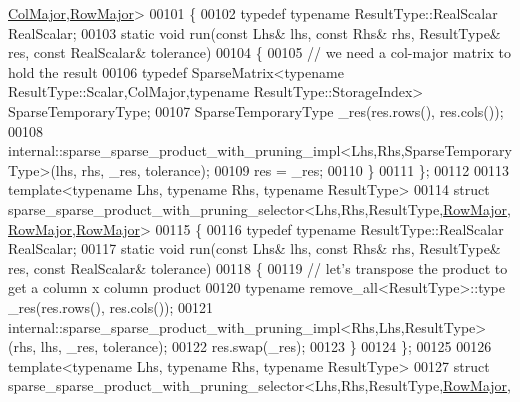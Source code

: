 \begin{DoxyCode}
      \hyperlink{group__enums_ggaacded1a18ae58b0f554751f6cdf9eb13a0cbd4bdd0abcfc0224c5fcb5e4f6669a}{ColMajor},\hyperlink{group__enums_ggaacded1a18ae58b0f554751f6cdf9eb13acfcde9cd8677c5f7caf6bd603666aae3}{RowMajor}>
00101 \{
00102   \textcolor{keyword}{typedef} \textcolor{keyword}{typename} ResultType::RealScalar RealScalar;
00103   \textcolor{keyword}{static} \textcolor{keywordtype}{void} run(\textcolor{keyword}{const} Lhs& lhs, \textcolor{keyword}{const} Rhs& rhs, ResultType& res, \textcolor{keyword}{const} RealScalar& tolerance)
00104   \{
00105     \textcolor{comment}{// we need a col-major matrix to hold the result}
00106     \textcolor{keyword}{typedef} SparseMatrix<typename ResultType::Scalar,ColMajor,typename ResultType::StorageIndex> 
      SparseTemporaryType;
00107     SparseTemporaryType \_res(res.rows(), res.cols());
00108     internal::sparse\_sparse\_product\_with\_pruning\_impl<Lhs,Rhs,SparseTemporaryType>(lhs, rhs, \_res, 
      tolerance);
00109     res = \_res;
00110   \}
00111 \};
00112 
00113 \textcolor{keyword}{template}<\textcolor{keyword}{typename} Lhs, \textcolor{keyword}{typename} Rhs, \textcolor{keyword}{typename} ResultType>
00114 \textcolor{keyword}{struct }sparse\_sparse\_product\_with\_pruning\_selector<Lhs,Rhs,ResultType,\hyperlink{group__enums_ggaacded1a18ae58b0f554751f6cdf9eb13acfcde9cd8677c5f7caf6bd603666aae3}{RowMajor},
      \hyperlink{group__enums_ggaacded1a18ae58b0f554751f6cdf9eb13acfcde9cd8677c5f7caf6bd603666aae3}{RowMajor},\hyperlink{group__enums_ggaacded1a18ae58b0f554751f6cdf9eb13acfcde9cd8677c5f7caf6bd603666aae3}{RowMajor}>
00115 \{
00116   \textcolor{keyword}{typedef} \textcolor{keyword}{typename} ResultType::RealScalar RealScalar;
00117   \textcolor{keyword}{static} \textcolor{keywordtype}{void} run(\textcolor{keyword}{const} Lhs& lhs, \textcolor{keyword}{const} Rhs& rhs, ResultType& res, \textcolor{keyword}{const} RealScalar& tolerance)
00118   \{
00119     \textcolor{comment}{// let's transpose the product to get a column x column product}
00120     \textcolor{keyword}{typename} remove\_all<ResultType>::type \_res(res.rows(), res.cols());
00121     internal::sparse\_sparse\_product\_with\_pruning\_impl<Rhs,Lhs,ResultType>(rhs, lhs, \_res, tolerance);
00122     res.swap(\_res);
00123   \}
00124 \};
00125 
00126 \textcolor{keyword}{template}<\textcolor{keyword}{typename} Lhs, \textcolor{keyword}{typename} Rhs, \textcolor{keyword}{typename} ResultType>
00127 \textcolor{keyword}{struct }sparse\_sparse\_product\_with\_pruning\_selector<Lhs,Rhs,ResultType,\hyperlink{group__enums_ggaacded1a18ae58b0f554751f6cdf9eb13acfcde9cd8677c5f7caf6bd603666aae3}{RowMajor},

\end{DoxyCode}
